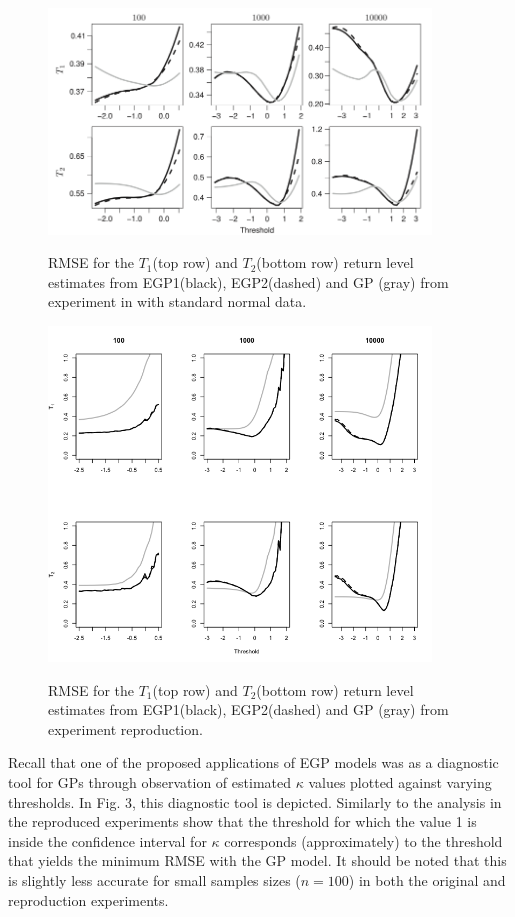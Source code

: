 \documentclass[12pt]{article}
\theoremstyle{definition}
\theoremstyle{definition}
\begin{document}
\begin{figure}[H]
\begin{center}
{\includegraphics[width=4.0in]{project/papafiles/fig2.papa.png}}
\caption{RMSE for the $T_1$(top row) and $T_2$(bottom row) return level estimates from EGP1(black), EGP2(dashed) and GP (gray) from experiment in \cite{papatawn} with standard normal data.}
\end{center}
\end{figure}
\begin{figure}[H]
\begin{center}
{\includegraphics[width=4.0in]{project/papafiles/fig2.me.png}}
\caption{RMSE for the $T_1$(top row) and $T_2$(bottom row) return level estimates from EGP1(black), EGP2(dashed) and GP (gray) from experiment reproduction.}
\end{center}
\end{figure}
Recall that one of the proposed applications of EGP models was as a diagnostic tool for GPs through observation of estimated $\kappa$ values plotted against varying thresholds. In Fig. 3, this diagnostic tool is depicted. Similarly to the analysis in \cite{papatawn} the reproduced experiments show that the threshold for which the value 1 is inside the confidence interval for $\kappa$ corresponds (approximately) to the threshold that yields the minimum RMSE with the GP model. It should be noted that this is slightly less accurate for small samples sizes ($n=100$) in both the original and reproduction experiments.
\end{document}
